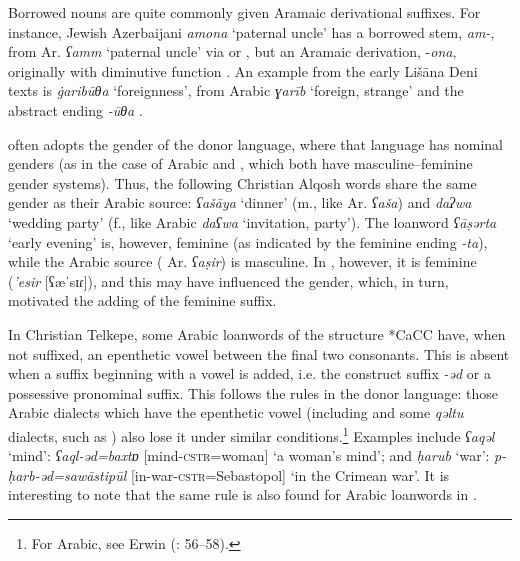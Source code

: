 \documentclass[output=paper]{langsci/langscibook}
\begin{document}
Borrowed nouns are quite commonly given Aramaic {derivational} suffixes. For instance, Jewish Azerbaijani \textit{amona} ‘paternal uncle’ has a borrowed {stem}, \textit{am-}, from Ar. \textit{ʕamm} ‘paternal uncle’ via  or , but an Aramaic {derivation}, \nobreakdash-\textit{ona}, originally with {diminutive} function \citep[165]{Garbell1965}. An example from the early Lišāna Deni texts is \textit{\.garibūθa} ‘foreignness’, from Arabic \textit{ɣarīb} ‘foreign, strange’ and the  abstract ending \textit{{}-ūθa} \citep[205]{Sabar1984}.

 often adopts the {gender} of the donor language, where that language has nominal genders (as in the case of Arabic and , which both have masculine--feminine {gender} systems). Thus, the following Christian Alqosh words share the same {gender} as their Arabic source: \textit{ʕašāya} ‘dinner’ (m., like  Ar. \textit{ʕaša}) and \textit{daʔwa} ‘wedding party’ (f., like Arabic \textit{daʕwa} ‘invitation, party’). The {loanword} \textit{ʕāṣərta} ‘early evening’ is, however, feminine (as indicated by the  feminine ending \textit{{}-ta}), while the Arabic source ( Ar. \textit{ʕaṣir}) is masculine. In , however, it is feminine (\textit{{}'esir} [ʕæˈsɪɾ]), and this may have influenced the {gender}, which, in turn, motivated the adding of the feminine suffix.

In Christian Telkepe, some Arabic {loanwords} of the structure *CaCC have, when not suffixed, an epenthetic vowel between the final two consonants. This is absent when a suffix beginning with a vowel is added, i.e. the construct suffix \textit{{}-əd} or a possessive pronominal suffix. This follows the rules in the donor language: those Arabic dialects which have the epenthetic vowel (including  and some \textit{qəltu} dialects, such as ) also lose it under similar conditions.\footnote{For  Arabic, see Erwin (\citeyear{Erwin1963}: 56–58).} Examples include \textit{ʕaqəl} ‘mind’: \textit{ʕaql-əd=baxtɒ} [mind-\textsc{cstr}=woman] ‘a woman's mind'; and \textit{ḥarub} ‘war’: \textit{p\nobreakdash-ḥarb\nobreakdash-əd=sawāstipūl} [in-war-\textsc{cstr}=Sebastopol] ‘in the Crimean war’. It is interesting to note that the same rule is also found for Arabic {loanwords} in  \citep[5]{Thackston2006}.
\end{document}
